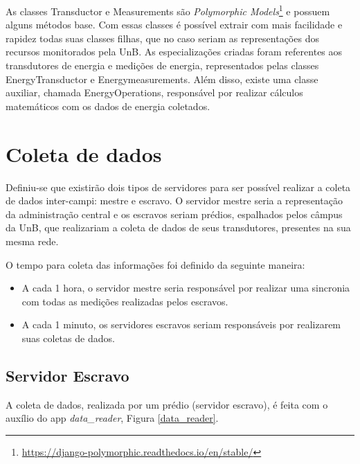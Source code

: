 As classes Transductor e Measurements são \textit{Polymorphic Models}\footnote{\url{https://django-polymorphic.readthedocs.io/en/stable/}} e possuem alguns métodos base. Com essas classes é possível extrair com mais facilidade e rapidez todas suas classes filhas, que no caso seriam as representações dos recursos monitorados pela UnB. As especializações criadas foram referentes aos transdutores de energia e medições de energia, representados pelas classes EnergyTransductor e Energymeasurements. Além disso, existe uma classe auxiliar, chamada EnergyOperations, responsável por realizar cálculos matemáticos com os dados de energia coletados.

\section{Coleta de dados}
Definiu-se que existirão dois tipos de servidores para ser possível realizar a coleta de dados inter-campi: mestre e escravo. O servidor mestre seria a representação da administração central e os escravos seriam prédios, espalhados pelos câmpus da UnB, que realizariam a coleta de dados de seus transdutores, presentes na sua mesma rede.

O tempo para coleta das informações foi definido da seguinte maneira:

\begin{itemize}
    \item A cada 1 hora, o servidor mestre seria responsável por realizar uma sincronia com todas as medições realizadas pelos escravos.
    \item A cada 1 minuto, os servidores escravos seriam responsáveis por realizarem suas coletas de dados.
\end{itemize}

\subsection{Servidor Escravo}
A coleta de dados, realizada por um prédio (servidor escravo), é feita com o auxílio do app \textit{data\_reader}, Figura \ref{data_reader}.

